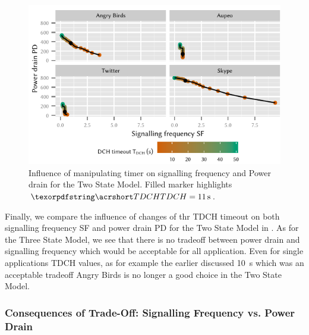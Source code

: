\begin{figure}
	\centering
	\includegraphics{network/network_traces/numerical_results/figures/2_state_signalling_vs_power_consumption}
	\caption{Influence of manipulating  timer on signalling frequency  and Power drain  for the Two State Model. Filled marker highlights \(\headershortacr{TDCH} = \SI{11}{\second}\).}\label{fig:network:network_traces:numerical_results:two_states:trade_off}
\end{figure}
Finally, we compare the influence of changes of thr \gls{TDCH} timeout on both signalling frequency \gls{SF} and power drain \gls{PD} for the Two State Model in .
As for the Three State Model, we see that there is no tradeoff between power drain and signalling frequency which would be acceptable for all application.
Even for single applications \gls{TDCH} values, as for example the earlier discussed \SI{10}{\second} which was an acceptable tradeoff Angry Birds is no longer a good choice in the Two State Model.

\subsubsection*{Consequences of Trade-Off: Signalling Frequency vs. Power Drain}\label{sec:network:network_traces:numerical_results:trade_off}

